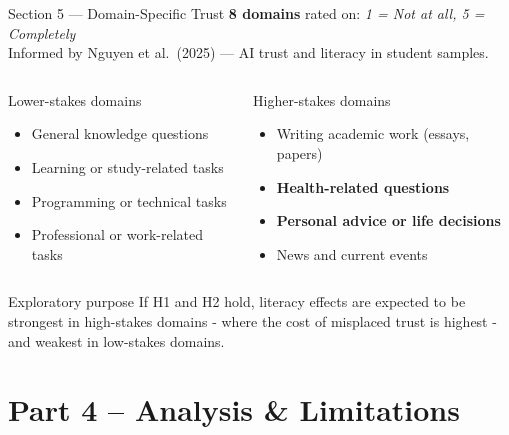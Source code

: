 \documentclass[10pt,aspectratio=169]{beamer}
\begin{document}
\begin{frame}{Section 5 --- Domain-Specific Trust}
  \textbf{8 domains} rated on: \textit{1 = Not at all, 5 = Completely}\\[4pt]
  Informed by Nguyen et al.\ (2025) --- AI trust and literacy in student samples.
  \vspace{0.5em}

  \begin{columns}[T]
    \begin{block}{Lower-stakes domains}
      \begin{itemize}
        \item General knowledge questions
        \item Learning or study-related tasks
        \item Programming or technical tasks
        \item Professional or work-related tasks
      \end{itemize}
    \end{block}
    \begin{alertblock}{Higher-stakes domains}
      \begin{itemize}
        \item Writing academic work (essays, papers)
        \item \textbf{Health-related questions}
        \item \textbf{Personal advice or life decisions}
        \item News and current events
      \end{itemize}
    \end{alertblock}
  \end{columns}
  \vspace{0.5em}
  \begin{exampleblock}{Exploratory purpose}
    If H1 and H2 hold, literacy effects are expected to be strongest in high-stakes domains - where the cost of misplaced trust is highest - and weakest in low-stakes domains.
  \end{exampleblock}
\end{frame}

\section{Part 4 -- Analysis \& Limitations}
 
\end{document}
